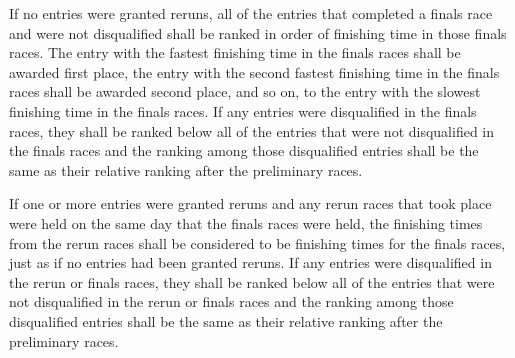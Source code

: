 If no entries were granted reruns, all of the entries that completed a finals race and were not disqualified shall be ranked in order of finishing time in those finals races. The entry with the fastest finishing time in the finals races shall be awarded first place, the entry with the second fastest finishing time in the finals races shall be awarded second place, and so on, to the entry with the slowest finishing time in the finals races. If any entries were disqualified in the finals races, they shall be ranked below all of the entries that were not disqualified in the finals races and the ranking among those disqualified entries shall be the same as their relative ranking after the preliminary races.

If one or more entries were granted reruns and any rerun races that took place were held on the same day that the finals races were held, the finishing times from the rerun races shall be considered to be finishing times for the finals races, just as if no entries had been granted reruns. If any entries were disqualified in the rerun or finals races, they shall be ranked below all of the entries that were not disqualified in the rerun or finals races and the ranking among those disqualified entries shall be the same as their relative ranking after the preliminary races.


